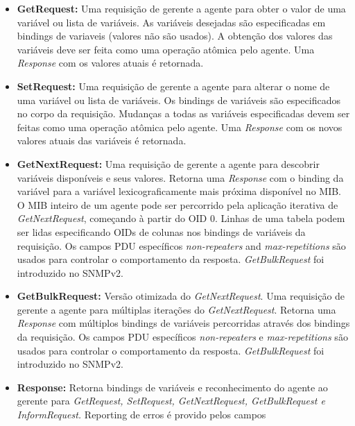 \documentclass[10pt]{article}
\begin{document}
\begin{enumerate}
    \begin{itemize}
        \item \textbf{GetRequest:} Uma requisição de gerente a agente para
        obter o valor de uma variável ou lista de variáveis. As variáveis
            desejadas são especificadas em bindings de variaveis (valores
            não são usados). A obtenção dos valores das variáveis deve
            ser feita como uma operação atômica pelo agente. Uma
        \textit{Response} com os valores atuais é retornada.
        \item \textbf{SetRequest: } Uma requisição de gerente a agente para
        alterar o nome de uma variável ou lista de variáveis. Os bindings
        de variáveis são especificados no corpo da requisição. Mudanças
        a todas as variáveis especificadas devem ser feitas como uma
        operação atômica pelo agente. Uma \textit{Response} com os
        novos valores atuais das variáveis é retornada.
        \item \textbf{GetNextRequest: } Uma requisição de gerente a agente
        para descobrir variáveis disponíveis e seus valores. Retorna uma
        \textit{Response} com o binding da variável para a variável 
        lexicograficamente mais próxima disponível no MIB. O MIB
        inteiro de um agente pode ser percorrido pela aplicação iterativa
        de \textit{GetNextRequest}, começando à partir do OID 0. Linhas de uma tabela podem ser lidas especificando OIDs de colunas nos
        bindings de variáveis da requisição. Os campos PDU específicos 
        \textit{non-repeaters} and \textit{max-repetitions} são usados para controlar
        o comportamento da resposta. \textit{GetBulkRequest} foi introduzido no
        SNMPv2.
        \item \textbf{GetBulkRequest: } Versão otimizada do \textit{GetNextRequest}.
        Uma requisição de gerente a agente para múltiplas iterações do \textit{
        GetNextRequest}. Retorna uma \textit{Response} com múltiplos bindings de
        variáveis percorridas através dos bindings da requisição. Os campos PDU
        específicos \textit{non-repeaters} e \textit{max-repetitions} são usados
        para controlar o comportamento da resposta. \textit{GetBulkRequest} foi
        introduzido no SNMPv2.
        \item \textbf{Response: } Retorna bindings de variáveis e reconhecimento
        do agente ao gerente para \textit{GetRequest, SetRequest, GetNextRequest,
        GetBulkRequest e InformRequest.} Reporting de erros é provido pelos campos

\end{itemize}
\end{enumerate}
\end{document}
